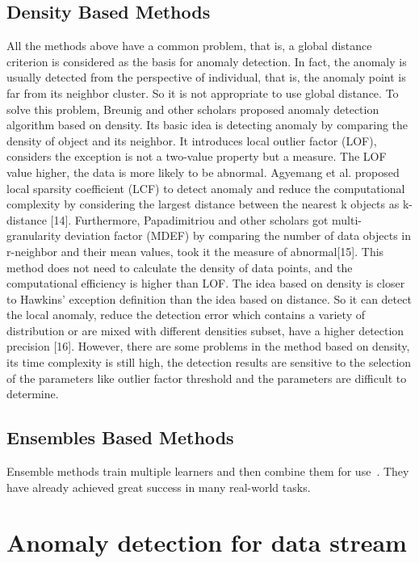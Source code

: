 \subsection{Density Based Methods}
All the methods above have a common problem,
that is,
a global distance criterion is considered as the basis for
anomaly detection.
In fact,
the anomaly is usually detected
from the perspective of individual,
that is,
the anomaly point is far from its neighbor cluster.
So it is not appropriate
to use global distance.
To solve this problem,
Breunig and other scholars proposed anomaly detection algorithm based
on density.
Its basic idea is detecting anomaly by comparing
the density of object and its neighbor.
It introduces local
outlier factor (LOF),
considers the exception is not a
two-value property but a measure.
The LOF value higher,
the data is more likely to be abnormal.
Agyemang et al.
proposed local sparsity coefficient (LCF) to detect anomaly
and reduce the computational complexity by considering
the largest distance between the nearest k objects as
k-distance [14].
Furthermore,
Papadimitriou and other scholars got multi-granularity 
deviation factor (MDEF) by
comparing the number of data objects in r-neighbor and
their mean values,
took it the measure of abnormal[15].
This method does not need to calculate the density of data
points,
and the computational efficiency is higher than LOF.
The idea based on density is closer to Hawkins’ exception
definition than the idea based on distance.
So it can detect the local anomaly,
reduce the detection error which contains
a variety of distribution or are mixed with different
densities subset,
have a higher detection precision [16].
However,
there are some problems in the method based on
density,
its time complexity is still high,
the detection
results are sensitive to the selection of the parameters like
outlier factor threshold and the parameters are difficult to
determine.
\subsection{Ensembles Based Methods}

Ensemble methods train multiple learners and 
then combine them for use~\cite{zhou2012ensemble}.  
They have already achieved great success in many real-world tasks.

\section{Anomaly detection for data stream}

